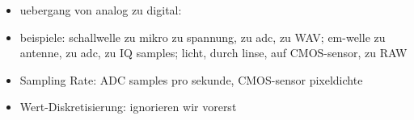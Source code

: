 \begin{itemize}
    \item uebergang von analog zu digital: 
    \item beispiele: schallwelle zu mikro zu spannung, zu adc, zu WAV; em-welle zu antenne, zu adc, zu IQ samples; licht, durch linse, auf CMOS-sensor, zu RAW
    \item Sampling Rate: ADC samples pro sekunde, CMOS-sensor pixeldichte
    \item Wert-Diskretisierung: ignorieren wir vorerst
\end{itemize}